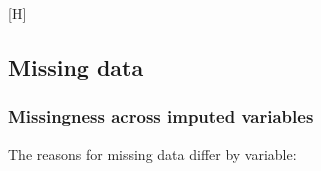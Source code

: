 \documentclass[
  letterpaper,
  DIV=11,
  numbers=noendperiod]{scrartcl}
\makeatletter
\renewenvironment{figure}%
   {\renewcommand\familydefault\sfdefault
    \@float{figure}}
   {\end@float}
\makeatother
\begin{document}
\begin{figure}[H]

\caption{\label{fig-afig-biomarkers}Boxplots for markers of systemic
inflammation including C-reactive protein (CRP), interleukin-6 (IL-6),
tumour necrosis factor alpha (TNF-\(\alpha\)) and malondialdehyde (MDA)}


\end{figure}%

\newpage

\subsection{Missing data}\label{missing-data}

\subsubsection{Missingness across imputed
variables}\label{missingness-across-imputed-variables}

The reasons for missing data differ by variable:
\end{document}
